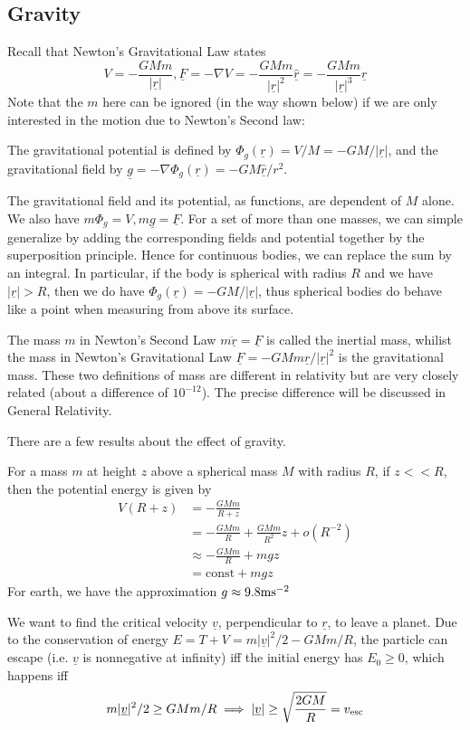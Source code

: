 \subsection{Gravity}
Recall that Newton's Gravitational Law states
$$V=-\frac{GMm}{|\underline{r}|},\underline{F}=-\nabla V=-\frac{GMm}{|\underline{r}|^2}\underline{\hat{r}}=-\frac{GMm}{|\underline{r}|^3}\underline{r}$$
Note that the $m$ here can be ignored (in the way shown below) if we are only interested in the motion due to Newton's Second law:
\begin{definition}
    The gravitational potential is defined by $\Phi_g(\underline{r})=V/M=-GM/|\underline{r}|$, and the gravitational field by $\underline{g}=-\nabla\Phi_g(\underline{r})=-GM\underline{\hat{r}}/r^2$.
\end{definition}
The gravitational field and its potential, as functions, are dependent of $M$ alone.
We also have $m\Phi_g=V,m\underline{g}=\underline{F}$.
For a set of more than one masses, we can simple generalize by adding the corresponding fields and potential together by the superposition principle.
Hence for continuous bodies, we can replace the sum by an integral.
In particular, if the body is spherical with radius $R$ and we have $|\underline{r}|>R$, then we do have $\Phi_g(\underline{r})=-GM/|\underline{r}|$, thus spherical bodies do behave like a point when measuring from above its surface.
\begin{note}
    The mass $m$ in Newton's Second Law $m\underline{\ddot{r}}=\underline{F}$ is called the inertial mass, whilist the mass in Newton's Gravitational Law $\underline{F}=-GMm\underline{r}/|\underline{r}|^2$ is the gravitational mass.
    These two definitions of mass are different in relativity but are very closely related (about a difference of $10^{-12}$).
    The precise difference will be discussed in General Relativity.
\end{note}
There are a few results about the effect of gravity.
\begin{example}
    For a mass $m$ at height $z$ above a spherical mass $M$ with radius $R$, if $z<<R$, then the potential energy is given by
    \begin{align*}
        V(R+z)&=-\frac{GMm}{R+z}\\
        &=-\frac{GMm}{R}+\frac{GMm}{R^2}z+o(R^{-2})\\
        &\approx -\frac{GMm}{R}+mgz\\
        &=\text{const}+mgz
    \end{align*}
    For earth, we have the approximation $g\approx 9.8{\rm ms^{-2}}$
\end{example}
\begin{example}
    We want to find the critical velocity $\underline{v}$, perpendicular to $\underline{r}$, to leave a planet.
    Due to the conservation of energy $E=T+V=m|\underline{v}|^2/2-GMm/R$, the particle can escape (i.e. $\underline{v}$ is nonnegative at infinity) iff the initial energy has $E_0\ge 0$, which happens iff
    $$m|\underline{v}|^2/2\ge GMm/R\implies |\underline{v}|\ge \sqrt{\frac{2GM}{R}}=v_{\rm esc}$$
\end{example}
